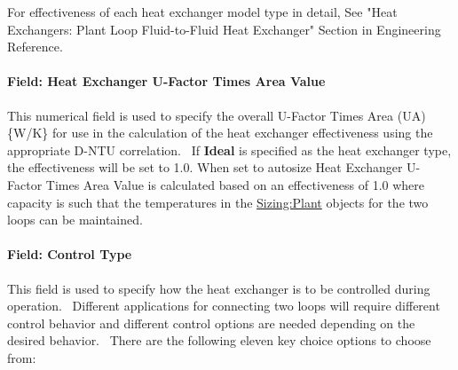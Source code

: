 For effectiveness of each heat exchanger model type in detail, See "Heat Exchangers: Plant Loop Fluid-to-Fluid Heat Exchanger" Section in Engineering Reference.

\paragraph{Field: Heat Exchanger U-Factor Times Area Value}\label{field-heat-exchanger-u-factor-times-area-value}

This numerical field is used to specify the overall U-Factor Times Area (UA) \{W/K\} for use in the calculation of the heat exchanger effectiveness using the appropriate D-NTU correlation.~ If \textbf{Ideal} is specified as the heat exchanger type, the effectiveness will be set to 1.0. When set to autosize Heat Exchanger U-Factor Times Area Value is calculated based on an effectiveness of 1.0 where capacity is such that the temperatures in the \hyperref[sizingplant]{Sizing:Plant} objects for the two loops can be maintained.

\paragraph{Field: Control Type}\label{field-control-type}

This field is used to specify how the heat exchanger is to be controlled during operation.~ Different applications for connecting two loops will require different control behavior and different control options are needed depending on the desired behavior.~ There are the following eleven key choice options to choose from:

